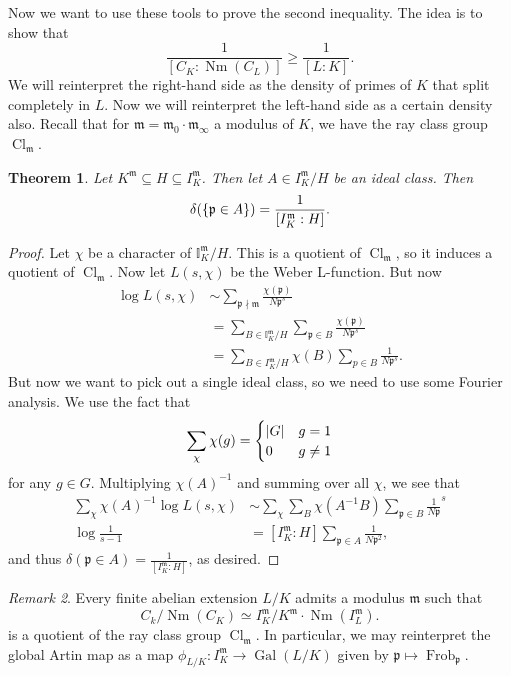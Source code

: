 \documentclass[leqno, openany]{memoir}
\newtheorem{thm}{Theorem}[section]
\theoremstyle{definition}
\theoremstyle{remark}
\newtheorem{rmk}[thm]{Remark}
\theoremstyle{plain}
\theoremstyle{definition}
\theoremstyle{remark}
\newcommand{\I}{\mathbb{I}}
\newcommand{\mf}[1]{\mathfrak{#1}}
\DeclareMathOperator{\Gal}{Gal}
\DeclareMathOperator{\Cl}{Cl}
\DeclareMathOperator{\Nm}{Nm}
\DeclareMathOperator{\Frob}{Frob}
\begin{document}
Now we want to use these tools to prove the second inequality. The idea is to
show that \[ \frac{1}{[C_K: \Nm(C_L)]} \geq \frac{1}{[L:K]}. \] We will
reinterpret the right-hand side as the density of primes of $K$ that split
completely in $L$. Now we will reinterpret the left-hand side as a certain
density also. Recall that for $\mf{m} = \mf{m}_0 \cdot \mf{m}_{\infty}$ a
modulus of $K$, we have the ray class group $\Cl_{\mf{m}}$. 

\begin{thm} Let $K^{\mf{m}} \subseteq H \subseteq I_K^{\mf{m}}$. Then let $A
    \in I_K^{\mf{m}}/H$ be an ideal class. Then \[ \delta(\qty{\mf{p} \in A}) =
    \frac{1}{[I_K^{\mf{m}} : H]}. \] \end{thm}

\begin{proof} Let $\chi$ be a character of $\I_K^{\mf{m}}/H$. This is a
    quotient of $\Cl_{\mf{m}}$, so it induces a quotient of $\Cl_{\mf{m}}$. Now
    let $L(s, \chi)$ be the Weber L-function. But now \begin{align*} \log L(s,
        \chi) &\sim \sum_{\mf{p} \nmid \mf{m}} \frac{\chi(\mf{p})}{N\mf{p}^s}
        \\ &= \sum_{B \in \I_K^{\mf{m}}/H} \sum_{\mf{p} \in B}
    \frac{\chi(\mf{p})}{N\mf{p}^s} \\ &= \sum_{B \in I_K^{\mf{m}}/H} \chi(B)
\sum_{p \in B} \frac{1}{N \mf{p}^s}.  \end{align*} But now we want to pick out
a single ideal class, so we need to use some Fourier analysis. We use the fact
that \[ \sum_{\chi} \chi(g) = \begin{cases} \abs{G} & g = 1 \\ 0 & g \neq 1
    \end{cases} \] for any $g \in G$. Multiplying ${\chi(A)}^{-1}$ and summing
    over all $\chi$, we see that \begin{align*} \sum_{\chi} {\chi(A)}^{-1} \log
        L(s, \chi) &\sim \sum_{\chi} \sum_B \chi(A^{-1}B) \sum_{\mf{p} \in B}
        \frac{1}{N \mf{p}}^s \\ \log \frac{1}{s-1}
                   &=[I_K^{\mf{m}}:H] \sum_{\mf{p} \in A} \frac{1}{N \mf{p}^2},
    \end{align*} and thus $\delta(\mf{p} \in A) = \frac{1}{[I_K^{\mf{m}}:H]}$,
as desired.  \end{proof}

\begin{rmk} Every finite abelian extension $L/K$ admits a modulus $\mf{m}$ such
    that \[ C_k/\Nm(C_K) \simeq I_K^{\mf{m}} / K^{\mf{m}} \cdot
    \Nm(I_L^{\mf{m}}). \] is a quotient of the ray class group $\Cl_{\mf{m}}$.
    In particular, we may reinterpret the global Artin map as a map $\phi_{L/K}
    \colon I_K^{\mf{m}} \to \Gal(L/K)$ given by $\mf{p} \mapsto
    \Frob_{\mf{p}}$.  \end{rmk}
\end{document}
